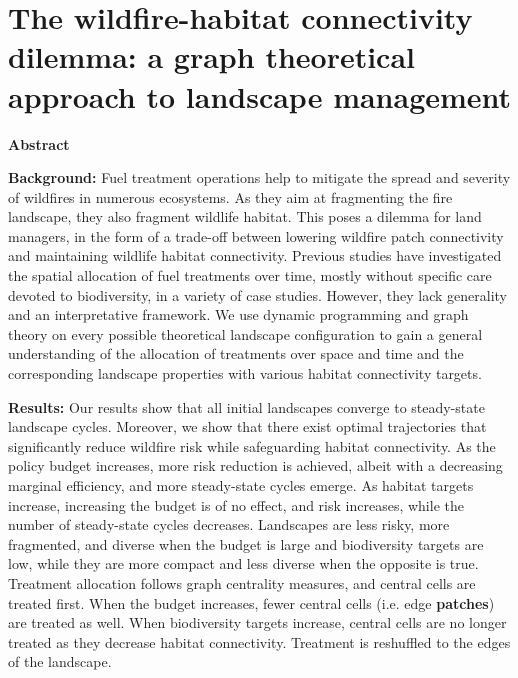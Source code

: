 \chapter{The wildfire-habitat connectivity dilemma: a graph theoretical approach to landscape management}

\begin{center}
\textbf{Abstract}\par
    \vspace*{.2cm}
    \noindent
    \begin{minipage}{0.9\textwidth}

\textbf{Background:} Fuel treatment operations help to mitigate the spread and severity of wildfires in numerous ecosystems. As they aim at fragmenting the fire landscape, they also fragment wildlife habitat. This poses a dilemma for land managers, in the form of a trade-off between lowering wildfire patch connectivity and maintaining wildlife habitat connectivity. Previous studies have investigated the spatial allocation of fuel treatments over time, mostly without specific care devoted to biodiversity, in a variety of case studies. However, they lack generality and an interpretative framework. We use dynamic programming and graph theory on every possible theoretical landscape configuration to gain a general understanding of the allocation of treatments over space and time and the corresponding landscape properties with various habitat connectivity targets. 
 
\textbf{Results:} Our results show that all initial landscapes converge to steady-state landscape cycles. Moreover, we show that there exist optimal trajectories that significantly reduce wildfire risk while safeguarding habitat connectivity. As the policy budget increases, more risk reduction is achieved, albeit with a decreasing marginal efficiency, and more steady-state cycles emerge. As habitat targets increase, increasing the budget is of no effect, and risk increases, while the number of steady-state cycles decreases. Landscapes are less risky, more fragmented, and diverse when the budget is large and biodiversity targets are low, while they are more compact and less diverse when the opposite is true. Treatment allocation follows graph centrality measures, and central cells are treated first. When the budget increases, fewer central cells (i.e. edge \textbf{patches}) are treated as well. When biodiversity targets increase, central cells are no longer treated as they decrease habitat connectivity. Treatment is reshuffled to the edges of the landscape.



\end{minipage}
\end{center}
